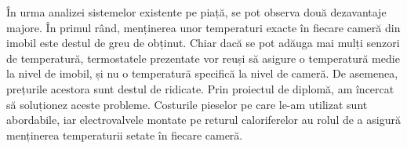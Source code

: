 	În urma analizei sistemelor existente pe piață, se pot observa două dezavantaje majore. În primul rând, menținerea unor temperaturi exacte în fiecare cameră din imobil este destul de greu de obținut. Chiar dacă se pot adăuga mai mulți senzori de temperatură, termostatele prezentate vor reuși să asigure o temperatură medie la nivel de imobil, și nu o temperatură specifică la nivel de cameră. De asemenea, prețurile acestora sunt destul de ridicate. Prin proiectul de diplomă, am încercat să soluționez aceste probleme. Costurile pieselor pe care le-am utilizat sunt abordabile, iar electrovalvele montate pe returul caloriferelor au rolul de a asigură menținerea temperaturii setate în fiecare cameră.
